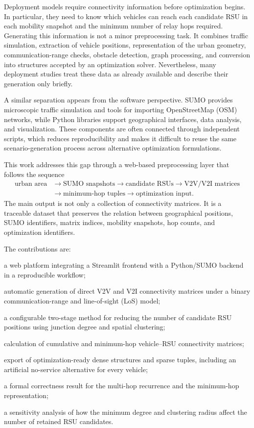 \documentclass[engproc,proceedingpaper,submit,oneauthor]{Definitions/mdpi}
\newcommand{\added}[1]{{\color{revisionblue}#1}}
\begin{document}
Deployment models require connectivity information before optimization begins. In particular, they need to know which vehicles can reach each candidate RSU in each mobility snapshot and the minimum number of relay hops required. Generating this information is not a minor preprocessing task. It combines traffic simulation, extraction of vehicle positions, representation of the urban geometry, communication-range checks, obstacle detection, graph processing, and conversion into structures accepted by an optimization solver. Nevertheless, many deployment studies treat these data as already available and describe their generation only briefly.

A similar separation appears from the software perspective. SUMO provides microscopic traffic simulation and tools for importing OpenStreetMap (OSM) networks, while Python libraries support geographical interfaces, data analysis, and visualization. These components are often connected through independent scripts, which reduces reproducibility and makes it difficult to reuse the same scenario-generation process across alternative optimization formulations.

This work addresses this gap through a web-based preprocessing layer that follows the sequence
\[
\begin{aligned}
\text{urban area}&\rightarrow\text{SUMO snapshots}\rightarrow\text{candidate RSUs}\rightarrow\text{V2V/V2I matrices}\\
&\rightarrow\text{minimum-hop tuples}\rightarrow\text{optimization input}.
\end{aligned}
\]
\added{The main output is not only a collection of connectivity matrices. It is a traceable dataset that preserves the relation between geographical positions, SUMO identifiers, matrix indices, mobility snapshots, hop counts, and optimization identifiers.}

The contributions are:
\begin{enumerate}
\item a web platform integrating a Streamlit frontend with a Python/SUMO backend in a reproducible workflow;
\item automatic generation of direct V2V and V2I connectivity matrices under a binary communication-range and line-of-sight (LoS) model;
\item a configurable two-stage method for reducing the number of candidate RSU positions using junction degree and spatial clustering;
\item calculation of cumulative and minimum-hop vehicle--RSU connectivity matrices;
\item export of optimization-ready dense structures and sparse tuples, including an artificial no-service alternative for every vehicle;
\added{\item a formal correctness result for the multi-hop recurrence and the minimum-hop representation;}
\added{\item a sensitivity analysis of how the minimum degree and clustering radius affect the number of retained RSU candidates.}
\end{enumerate}
\end{document}

